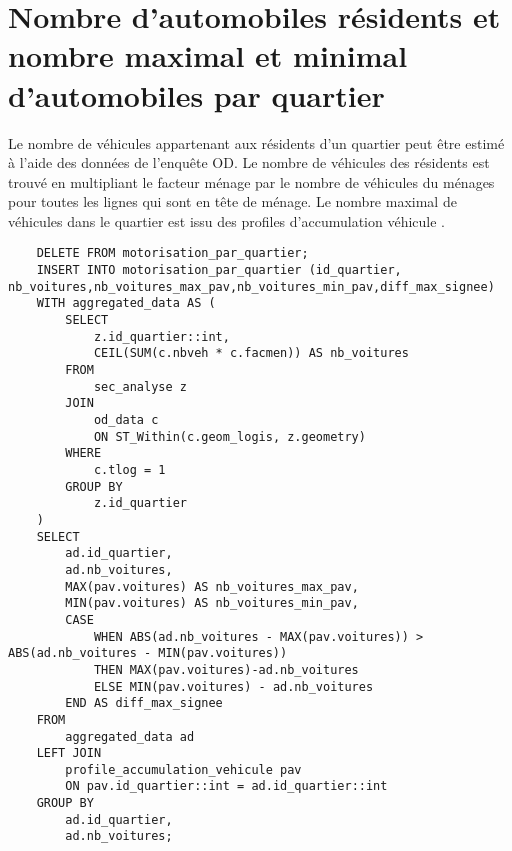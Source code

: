 \section{Nombre d'automobiles résidents et nombre maximal et minimal d'automobiles par quartier}\label{sec:annex_motorisation_par_quartier}
Le nombre de véhicules appartenant aux résidents d'un quartier peut être estimé à l'aide des données de l'enquête OD. Le nombre de véhicules des résidents est trouvé en multipliant le facteur ménage par le nombre de véhicules du ménages pour toutes les lignes qui sont en tête de ménage. Le nombre maximal de véhicules dans le quartier est issu des profiles d'accumulation véhicule \parencite{diallo_methodology_2015}.
\begin{lstlisting}
    DELETE FROM motorisation_par_quartier;
    INSERT INTO motorisation_par_quartier (id_quartier, nb_voitures,nb_voitures_max_pav,nb_voitures_min_pav,diff_max_signee)
    WITH aggregated_data AS (
        SELECT
            z.id_quartier::int,
            CEIL(SUM(c.nbveh * c.facmen)) AS nb_voitures
        FROM
            sec_analyse z
        JOIN
            od_data c
            ON ST_Within(c.geom_logis, z.geometry)
        WHERE
            c.tlog = 1
        GROUP BY
            z.id_quartier
    )
    SELECT
        ad.id_quartier,
        ad.nb_voitures,
        MAX(pav.voitures) AS nb_voitures_max_pav,
        MIN(pav.voitures) AS nb_voitures_min_pav,
        CASE
            WHEN ABS(ad.nb_voitures - MAX(pav.voitures)) > ABS(ad.nb_voitures - MIN(pav.voitures))
            THEN MAX(pav.voitures)-ad.nb_voitures
            ELSE MIN(pav.voitures) - ad.nb_voitures
        END AS diff_max_signee
    FROM
        aggregated_data ad
    LEFT JOIN
        profile_accumulation_vehicule pav
        ON pav.id_quartier::int = ad.id_quartier::int
    GROUP BY
        ad.id_quartier,
        ad.nb_voitures;
\end{lstlisting}
